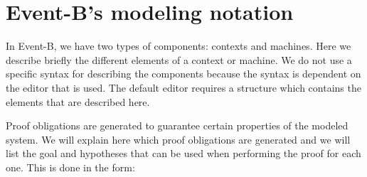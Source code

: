 \newcommand{\varlist}[1]{\mathbf{#1}}
\newcommand{\allconstants}{\varlist{c}}
\newcommand{\absvariables}{\varlist{v}}
\newcommand{\concvariables}{\varlist{w}}
\newcommand{\allvariables}{{\absvariables,\concvariables}}
\newcommand{\absparameters}{\varlist{t}}
\newcommand{\concparameters}{\varlist{u}}
\newcommand{\allparameters}{{\absparameters,\concparameters}}
\newcommand{\absbeforeafter}{\mathcal{S}}
\newcommand{\concbeforeafter}{\mathcal{T}}

\newcommand{\axioms}{A(\allconstants)}
\newcommand{\absinvariants}{I(\allconstants,\absvariables)}
\newcommand{\concinvariants}{J(\allconstants,\absvariables,\concvariables)}
\newcommand{\absguards}{G(\allconstants,\absvariables,\absparameters)}
\newcommand{\concguards}{H(\allconstants,\concvariables,\concparameters)}
\newcommand{\witnesspred}{W(\allconstants,\allvariables,\absvariables',\concvariables',\allparameters)}

\clearpage

\section{Event-B's modeling notation}
\label{modeling_notation}

In Event-B, we have two types of components: contexts and machines.
Here we describe briefly the different elements of a context or machine.
We do not use a specific syntax for describing the components because the syntax is dependent on the editor that is
used. The default editor requires a structure which contains the elements that are described here.

Proof obligations are generated to guarantee certain properties of the modeled system.
We will explain here which proof obligations are generated and we will list the goal and hypotheses that can be used
when performing the proof for each one.
This is done in the form:


